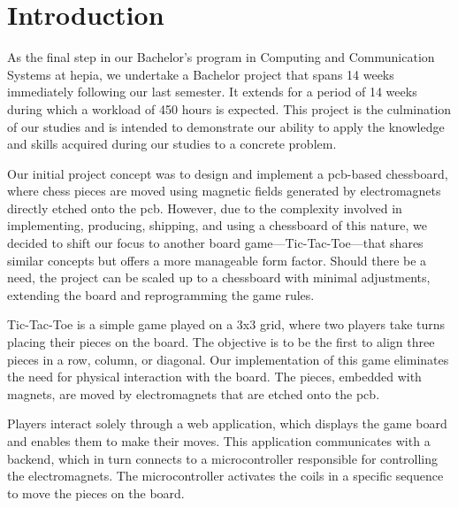 \chapter*{Introduction}

As the final step in our Bachelor's program in Computing and Communication Systems at \gls{hepia}, we undertake a Bachelor project that spans 14 weeks immediately following our last semester. It extends for a period of 14 weeks during which a workload of 450 hours is expected. This project is the culmination of our studies and is intended to demonstrate our ability to apply the knowledge and skills acquired during our studies to a concrete problem.

Our initial project concept was to design and implement a \gls{pcb}-based chessboard, where chess pieces are moved using magnetic fields generated by electromagnets directly etched onto the \gls{pcb}. However, due to the complexity involved in implementing, producing, shipping, and using a chessboard of this nature, we decided to shift our focus to another board game—Tic-Tac-Toe—that shares similar concepts but offers a more manageable form factor. Should there be a need, the project can be scaled up to a chessboard with minimal adjustments, extending the board and reprogramming the game rules.

Tic-Tac-Toe is a simple game played on a 3x3 grid, where two players take turns placing their pieces on the board. The objective is to be the first to align three pieces in a row, column, or diagonal. Our implementation of this game eliminates the need for physical interaction with the board. The pieces, embedded with magnets, are moved by electromagnets that are etched onto the \gls{pcb}.


Players interact solely through a web application, which displays the game board and enables them to make their moves. This application communicates with a backend, which in turn connects to a microcontroller responsible for controlling the electromagnets. The microcontroller activates the coils in a specific sequence to move the pieces on the board.

